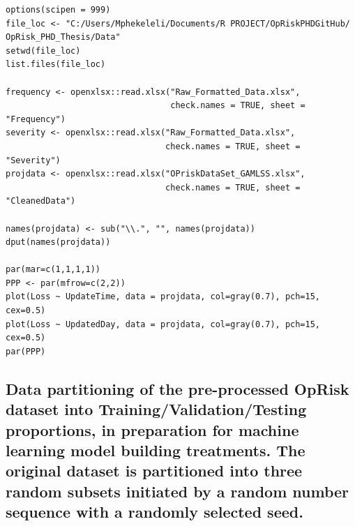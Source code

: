 \documentclass{DissertateUSU}
\begin{document}
\small

\begin{verbatim}
options(scipen = 999)
file_loc <- "C:/Users/Mphekeleli/Documents/R PROJECT/OpRiskPHDGitHub/
OpRisk_PHD_Thesis/Data"
setwd(file_loc)
list.files(file_loc)

frequency <- openxlsx::read.xlsx("Raw_Formatted_Data.xlsx",
                                 check.names = TRUE, sheet = "Frequency")
severity <- openxlsx::read.xlsx("Raw_Formatted_Data.xlsx",
                                check.names = TRUE, sheet = "Severity")
projdata <- openxlsx::read.xlsx("OPriskDataSet_GAMLSS.xlsx",
                                check.names = TRUE, sheet = "CleanedData")

names(projdata) <- sub("\\.", "", names(projdata))
dput(names(projdata))

par(mar=c(1,1,1,1))
PPP <- par(mfrow=c(2,2))
plot(Loss ~ UpdateTime, data = projdata, col=gray(0.7), pch=15, cex=0.5)
plot(Loss ~ UpdatedDay, data = projdata, col=gray(0.7), pch=15, cex=0.5)
par(PPP)
\end{verbatim}

\normalsize

\subsection{Data partitioning of the pre-processed OpRisk dataset into Training/Validation/Testing proportions, in preparation for machine learning model building treatments. The original dataset is partitioned into three random subsets initiated by a random number sequence with a randomly selected seed.}
\label{ssec:GAMLSS Data Training/Validation/Testing}

\small
\end{document}
